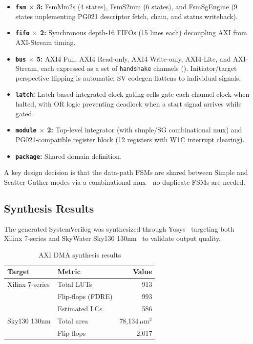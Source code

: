 \documentclass[11pt,twocolumn]{article}
\begin{document}
\begin{itemize}
\item \textbf{\texttt{fsm} $\times$ 3:} FsmMm2s (4 states), FsmS2mm (6 states), and FsmSgEngine (9 states implementing PG021 descriptor fetch, chain, and status writeback).
\item \textbf{\texttt{fifo} $\times$ 2:} Synchronous depth-16 FIFOs (15 lines each) decoupling AXI from AXI-Stream timing.
\item \textbf{\texttt{bus} $\times$ 5:} AXI4 Full, AXI4 Read-only, AXI4 Write-only, AXI4-Lite, and AXI-Stream, each expressed as a set of \texttt{handshake} channels (). Initiator/target perspective flipping is automatic; SV codegen flattens to individual signals.
\item \textbf{\texttt{latch}:} Latch-based integrated clock gating cells gate each channel clock when halted, with OR logic preventing deadlock when a start signal arrives while gated.
\item \textbf{\texttt{module} $\times$ 2:} Top-level integrator (with simple/SG combinational mux) and PG021-compatible register block (12 registers with W1C interrupt clearing).
\item \textbf{\texttt{package}:} Shared domain definition.
\end{itemize}

A key design decision is that the data-path FSMs are shared between Simple and Scatter-Gather modes via a combinational mux---no duplicate FSMs are needed.

\subsection{Synthesis Results}

The generated SystemVerilog was synthesized through Yosys~\cite{yosys} targeting both Xilinx 7-series and SkyWater Sky130 130nm~\cite{sky130pdk} to validate output quality.

\begin{table}[t]
\centering
\caption{AXI DMA synthesis results}
\label{tab:dmasyn}
\footnotesize
\begin{tabular}{@{}llr@{}}
\toprule
\textbf{Target} & \textbf{Metric} & \textbf{Value} \\
\midrule
Xilinx 7-series & Total LUTs & 913 \\
                & Flip-flops (FDRE) & 993 \\
                & Estimated LCs & 586 \\
\midrule
Sky130 130nm    & Total area & 78,134\,$\mu$m$^2$ \\
                & Flip-flops & 2,017 \\
\bottomrule
\end{tabular}
\end{table}
\end{document}
